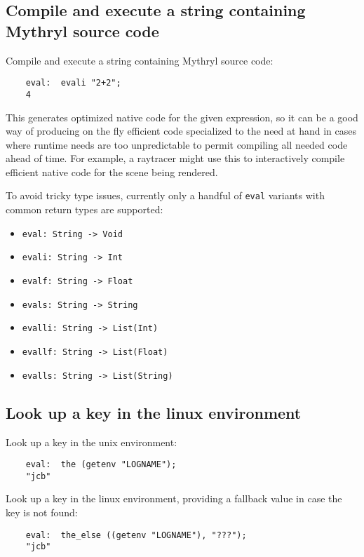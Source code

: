 \subsection{Compile and execute a string containing Mythryl source code}

Compile and execute a string containing Mythryl source code:
\begin{verbatim}
    eval:  evali "2+2";
    4
\end{verbatim}

This generates optimized native code for the given expression, 
so it can be a good way of producing on the fly efficient code 
specialized to the need at hand in cases where runtime needs 
are too unpredictable to permit compiling all needed code 
ahead of time.  For example, a raytracer might use this to 
interactively compile efficient native code for the scene being 
rendered.

To avoid tricky type issues, currently only a handful of 
{\tt eval} variants with common return types are supported:
\begin{itemize}
\item {\tt eval: String -> Void} 
\item {\tt evali: String -> Int} 
\item {\tt evalf: String -> Float} 
\item {\tt evals: String -> String} 
\item {\tt evalli: String -> List(Int)} 
\item {\tt evallf: String -> List(Float)} 
\item {\tt evalls: String -> List(String)} 
\end{itemize}

\cutend*

\subsection{Look up a key in the linux environment}

Look up a key in the unix environment:
\begin{verbatim}
    eval:  the (getenv "LOGNAME");
    "jcb"
\end{verbatim}

Look up a key in the linux environment, 
providing a fallback value in case 
the key is not found:
\begin{verbatim}
    eval:  the_else ((getenv "LOGNAME"), "???");
    "jcb"
\end{verbatim}

